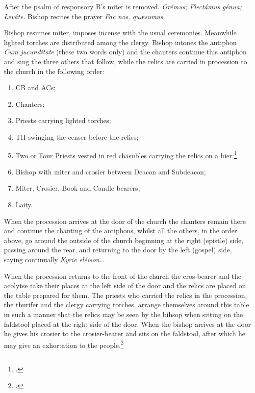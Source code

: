 \documentclass[letterpaper]{report}
\newcommand\src{\textsc{s.r.c.}}
\begin{document}
{\rubric After the psalm of responsory B's miter is removed. \textit{Orémus;
Flectámus génua; Leváte.} Bishop recites the prayer \textit{Fac nos, qu\ae sumus.}

\rubric Bishop resumes miter, imposes incense with the usual ceremonies.
Meanwhile lighted torches are distributed among the clergy. Bishop intones the
antiphon \textit{Cum jucunditate} (these two words only) and the chanters
continue this antiphon and sing the three others that follow, while the relics
are carried in procession to the church in the following order:

\begin{enumerate}
    \item CB and ACs;
    \item Chanters;
    \item Priests carrying lighted torches;
    \item TH swinging the censer before the relics;
    \item Two or Four Priests vested in red chasubles carrying the relics on a
        bier;\footcite[Instead of these priets the consecrator may carry the
        relics on s salver.][footnote 1, p. 81.]{consecranda}
    \item Bishop with miter and crosier between Deacon and Subdeacon;
    \item Miter, Crosier, Book and Candle bearers;
    \item Laity.
\end{enumerate}

When the procession arrives at the door of the church the chanters remain there
and continue the chanting of the antiphons, whilst all the others, in the order
above, go around the outside of the church beginning at the right (epistle)
side, passing around the rear, and returning to the door by the left (gospel)
side, saying continually \textit{Kyrie eléison\dots}

\rubric When the procession returns to the front of the church the cros-bearer
and the acolytse take their places at the left side of the door and the relics
are placed on the table prepared for them. The priests who carried the relics
in the procession, the thurifer and the clergy carrying torches, arrange
themselves around this table in such a manner that the relics may be seen by
the bihsop when sitting on the faldstool placed at the right side of the door.
When the bishop arrives at the door he gives his crosier to the crosier-bearer
and sits on the faldstool, after which he may give an exhortation to the
people.\footcite[The exhortation here spoken of, the decrees of the Council of
Trent which according to the Pontifical are now read by the archdeacon (any
priest), the address of the Bishop to the founder of the church and the
latter's reply may be omitted. --- \src, May 17, 1890, n. 3729 ad
VIII.][footnote 2, p. 82.]{consecranda}

}
\end{document}
